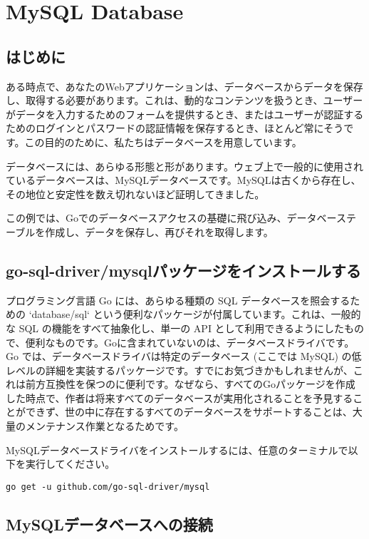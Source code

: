 \section{MySQL Database}

\subsection{はじめに}

ある時点で、あなたのWebアプリケーションは、データベースからデータを保存し、取得する必要があります。これは、動的なコンテンツを扱うとき、ユーザーがデータを入力するためのフォームを提供するとき、またはユーザーが認証するためのログインとパスワードの認証情報を保存するとき、ほとんど常にそうです。この目的のために、私たちはデータベースを用意しています。

データベースには、あらゆる形態と形があります。ウェブ上で一般的に使用されているデータベースは、MySQLデータベースです。MySQLは古くから存在し、その地位と安定性を数え切れないほど証明してきました。

この例では、Goでのデータベースアクセスの基礎に飛び込み、データベーステーブルを作成し、データを保存し、再びそれを取得します。

\subsection{go-sql-driver/mysqlパッケージをインストールする}

プログラミング言語 Go には、あらゆる種類の SQL データベースを照会するための `database/sql` という便利なパッケージが付属しています。これは、一般的な SQL の機能をすべて抽象化し、単一の API として利用できるようにしたもので、便利なものです。Goに含まれていないのは、データベースドライバです。Go では、データベースドライバは特定のデータベース (ここでは MySQL) の低レベルの詳細を実装するパッケージです。すでにお気づきかもしれませんが、これは前方互換性を保つのに便利です。なぜなら、すべてのGoパッケージを作成した時点で、作者は将来すべてのデータベースが実用化されることを予見することができず、世の中に存在するすべてのデータベースをサポートすることは、大量のメンテナンス作業となるためです。

MySQLデータベースドライバをインストールするには、任意のターミナルで以下を実行してください。


\begin{lstlisting}[numbers=none]
go get -u github.com/go-sql-driver/mysql
\end{lstlisting}

\subsection{MySQLデータベースへの接続}

